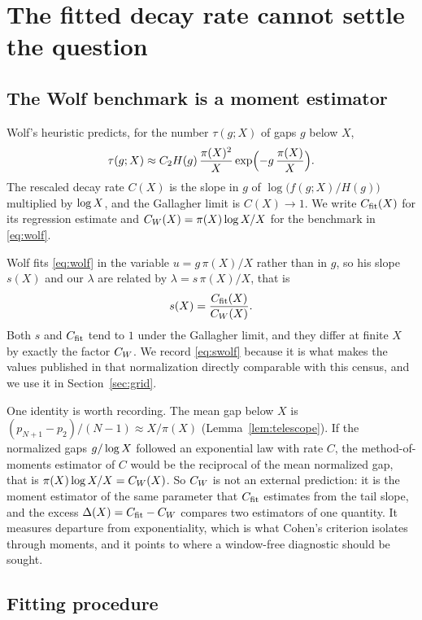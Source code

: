 \documentclass[11pt,a4paper]{article}
\begin{document}
\section{The fitted decay rate cannot settle the question}
\label{sec:cfit}

\subsection{The Wolf benchmark is a moment estimator}

Wolf's heuristic \cite{Wolf2011,Wolf2014} predicts, for the number $\tau(g;X)$ of gaps $g$ below $X$,
\begin{equation}
\tau(g;X)\approx C_2H(g)\,\frac{\pi(X)^2}{X}\exp\Bigl(-g\,\frac{\pi(X)}{X}\Bigr).
\label{eq:wolf}
\end{equation}
The rescaled decay rate $C(X)$ is the slope in $g$ of $\log\bigl(f(g;X)/H(g)\bigr)$ multiplied by $\log X$, and the Gallagher limit is $C(X)\to1$. We write $C_{\mathrm{fit}}(X)$ for its regression estimate and $C_W(X)=\pi(X)\log X/X$ for the benchmark in \eqref{eq:wolf}.

Wolf fits \eqref{eq:wolf} in the variable $u=g\,\pi(X)/X$ rather than in $g$, so his slope $s(X)$ and our $\lambda$ are related by $\lambda=s\,\pi(X)/X$, that is
\begin{equation}
s(X)=\frac{C_{\mathrm{fit}}(X)}{C_W(X)}.
\label{eq:swolf}
\end{equation}
Both $s$ and $C_{\mathrm{fit}}$ tend to $1$ under the Gallagher limit, and they differ at finite $X$ by exactly the factor $C_W$. We record \eqref{eq:swolf} because it is what makes the values published in that normalization directly comparable with this census, and we use it in Section~\ref{sec:grid}.

One identity is worth recording. The mean gap below $X$ is $(p_{N+1}-p_2)/(N-1)\approx X/\pi(X)$ (Lemma~\ref{lem:telescope}). If the normalized gaps $g/\log X$ followed an exponential law with rate $C$, the method-of-moments estimator of $C$ would be the reciprocal of the mean normalized gap, that is $\pi(X)\log X/X=C_W(X)$. So $C_W$ is not an external prediction: it is the moment estimator of the same parameter that $C_{\mathrm{fit}}$ estimates from the tail slope, and the excess $\Delta(X)=C_{\mathrm{fit}}-C_W$ compares two estimators of one quantity. It measures departure from exponentiality, which is what Cohen's criterion \cite{Cohen2025} isolates through moments, and it points to where a window-free diagnostic should be sought.

\subsection{Fitting procedure}
\end{document}
